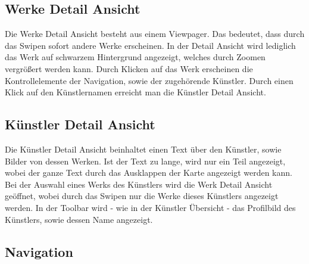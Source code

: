 \subsection{Werke Detail Ansicht}
Die Werke Detail Ansicht besteht aus einem Viewpager. Das bedeutet, dass durch das Swipen sofort andere Werke erscheinen. In der Detail Ansicht wird lediglich das Werk auf schwarzem Hintergrund angezeigt, welches durch Zoomen vergrößert werden kann. Durch Klicken auf das Werk erscheinen die Kontrollelemente der Navigation, sowie der zugehörende Künstler. Durch einen Klick auf den Künstlernamen erreicht man die Künstler Detail Ansicht.

\subsection{Künstler Detail Ansicht}
Die Künstler Detail Ansicht beinhaltet einen Text über den Künstler, sowie Bilder von dessen Werken. Ist der Text zu lange, wird nur ein Teil angezeigt, wobei der ganze Text durch das Ausklappen der Karte angezeigt werden kann. Bei der Auswahl eines Werks des Künstlers wird die Werk Detail Ansicht geöffnet, wobei durch das Swipen nur die Werke dieses Künstlers angezeigt werden. In der Toolbar wird - wie in der Künstler Übersicht - das Profilbild des Künstlers, sowie dessen Name angezeigt. 


\subsection{Navigation}\label{section_navigation}
